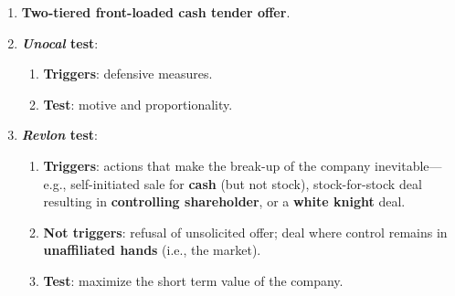 \begin{enumerate}
    \item \textbf{Two-tiered front-loaded cash tender offer}.
    \item \textbf{\emph{Unocal} test}:
    \begin{enumerate}
        \item \textbf{Triggers}: defensive measures.
        \item \textbf{Test}: motive and proportionality.
    \end{enumerate}
    \item \textbf{\emph{Revlon} test}:
    \begin{enumerate}
        \item \textbf{Triggers}: actions that make the break-up of the company 
        inevitable---e.g., self-initiated sale for \textbf{cash} (but not 
        stock), stock-for-stock deal resulting in \textbf{controlling 
        shareholder}, or a \textbf{white knight} deal.
        \item \textbf{Not triggers}: refusal of unsolicited offer; deal where 
        control remains in \textbf{unaffiliated hands} (i.e., the market).
        \item \textbf{Test}: maximize the short term value of the company.
    \end{enumerate}
\end{enumerate}
